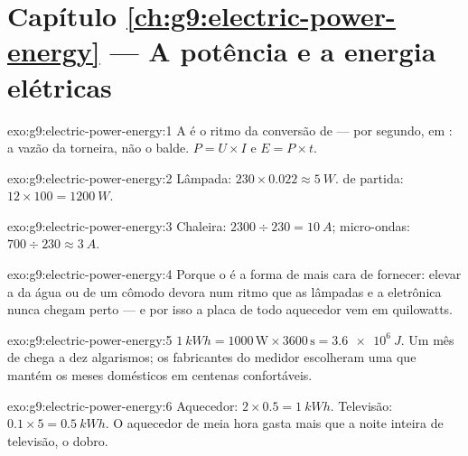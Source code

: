 \section*{Capítulo \ref{ch:g9:electric-power-energy} --- A potência e a energia elétricas}

\begin{solution}{exo:g9:electric-power-energy:1}
A  é o ritmo da conversão de  ---  por segundo,
em : a vazão da torneira, não o balde. $P = U \times I$ e
$E = P \times t$.
\end{solution}

\begin{solution}{exo:g9:electric-power-energy:2}
Lâmpada: $230 \times 0.022 \approx \qty{5}{W}$.  de partida:
$12 \times 100 = \qty{1200}{W}$.
\end{solution}

\begin{solution}{exo:g9:electric-power-energy:3}
Chaleira: $2300 \div 230 = \qty{10}{A}$; micro-ondas:
$700 \div 230 \approx \qty{3}{A}$.
\end{solution}

\begin{solution}{exo:g9:electric-power-energy:4}
Porque o  é a forma de  mais cara de fornecer: elevar a
 da água ou de um cômodo devora  num ritmo que as
lâmpadas e a eletrônica nunca chegam perto --- e por isso a placa de
todo aquecedor vem em quilowatts.
\end{solution}

\begin{solution}{exo:g9:electric-power-energy:5}
$\qty{1}{kWh} = 1000 \, \text{W} \times 3600 \, \text{s} =
\qty{3.6e6}{J}$. Um mês de  chega a dez algarismos; os
fabricantes do medidor escolheram uma  que mantém os meses
domésticos em centenas confortáveis.
\end{solution}

\begin{solution}{exo:g9:electric-power-energy:6}
Aquecedor: $2 \times 0.5 = \qty{1}{kWh}$. Televisão:
$0.1 \times 5 = \qty{0.5}{kWh}$. O aquecedor de meia hora gasta mais
que a noite inteira de televisão, o dobro.
\end{solution}

